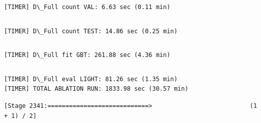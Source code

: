 \documentclass[11pt]{article}
\begin{document}
    \begin{Verbatim}[commandchars=\\\{\}]

    \end{Verbatim}

    \begin{Verbatim}[commandchars=\\\{\}]
[TIMER] D\_Full count VAL: 6.63 sec (0.11 min)
    \end{Verbatim}

    \begin{Verbatim}[commandchars=\\\{\}]

    \end{Verbatim}

    \begin{Verbatim}[commandchars=\\\{\}]
[TIMER] D\_Full count TEST: 14.86 sec (0.25 min)
    \end{Verbatim}

    \begin{Verbatim}[commandchars=\\\{\}]

    \end{Verbatim}

    \begin{Verbatim}[commandchars=\\\{\}]
[TIMER] D\_Full fit GBT: 261.88 sec (4.36 min)
    \end{Verbatim}

    \begin{Verbatim}[commandchars=\\\{\}]

    \end{Verbatim}

    \begin{Verbatim}[commandchars=\\\{\}]
[TIMER] D\_Full eval LIGHT: 81.26 sec (1.35 min)
[TIMER] TOTAL ABLATION RUN: 1833.98 sec (30.57 min)
    \end{Verbatim}

    \begin{Verbatim}[commandchars=\\\{\}]
[Stage 2341:============================>                           (1 + 1) / 2]
    \end{Verbatim}
\end{document}
